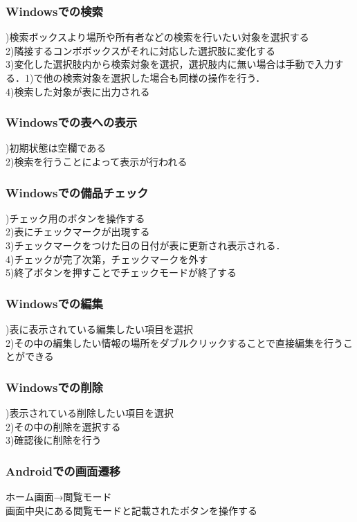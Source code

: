 \documentclass[11pt,a4j]{jarticle}
\begin{document}
\subsubsection{Windowsでの検索}
)検索ボックスより場所や所有者などの検索を行いたい対象を選択する
\\2)隣接するコンボボックスがそれに対応した選択肢に変化する
\\3)変化した選択肢内から検索対象を選択，選択肢内に無い場合は手動で入力する．1)で他の検索対象を選択した場合も同様の操作を行う．
\\4)検索した対象が表に出力される

\subsubsection{Windowsでの表への表示}
)初期状態は空欄である
\\2)検索を行うことによって表示が行われる

\subsubsection{Windowsでの備品チェック}
)チェック用のボタンを操作する
\\2)表にチェックマークが出現する
\\3)チェックマークをつけた日の日付が表に更新され表示される．
\\4)チェックが完了次第，チェックマークを外す
\\5)終了ボタンを押すことでチェックモードが終了する

\subsubsection{Windowsでの編集}
)表に表示されている編集したい項目を選択
\\2)その中の編集したい情報の場所をダブルクリックすることで直接編集を行うことができる

\subsubsection{Windowsでの削除}
)表示されている削除したい項目を選択
\\2)その中の削除を選択する
\\3)確認後に削除を行う

\subsubsection{Androidでの画面遷移}
\noindent
{ホーム画面→閲覧モード}
\\画面中央にある閲覧モードと記載されたボタンを操作する
\end{document}

